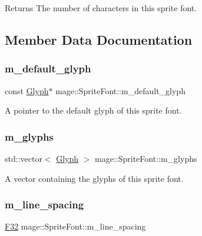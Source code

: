 \begin{DoxyReturn}{Returns}
The number of characters in this sprite font. 
\end{DoxyReturn}


\subsection{Member Data Documentation}
\hypertarget{classmage_1_1_sprite_font_ad25667d3bfb539b71b39124fdc8ed6d6}{}\label{classmage_1_1_sprite_font_ad25667d3bfb539b71b39124fdc8ed6d6} 
\subsubsection{\texorpdfstring{m\+\_\+default\+\_\+glyph}{m\_default\_glyph}}
{\footnotesize\ttfamily const \hyperlink{structmage_1_1_glyph}{Glyph}$\ast$ mage\+::\+Sprite\+Font\+::m\+\_\+default\+\_\+glyph\hspace{0.3cm}{\ttfamily [private]}}

A pointer to the default glyph of this sprite font. \hypertarget{classmage_1_1_sprite_font_a8862df8d743ea33996c76e421724c0a7}{}\label{classmage_1_1_sprite_font_a8862df8d743ea33996c76e421724c0a7} 
\subsubsection{\texorpdfstring{m\+\_\+glyphs}{m\_glyphs}}
{\footnotesize\ttfamily std\+::vector$<$ \hyperlink{structmage_1_1_glyph}{Glyph} $>$ mage\+::\+Sprite\+Font\+::m\+\_\+glyphs\hspace{0.3cm}{\ttfamily [private]}}

A vector containing the glyphs of this sprite font. \hypertarget{classmage_1_1_sprite_font_a0d85446d7a3e2c1f73a013314fca4d84}{}\label{classmage_1_1_sprite_font_a0d85446d7a3e2c1f73a013314fca4d84} 
\subsubsection{\texorpdfstring{m\+\_\+line\+\_\+spacing}{m\_line\_spacing}}
{\footnotesize\ttfamily \hyperlink{namespacemage_aa97e833b45f06d60a0a9c4fc22ae02c0}{F32} mage\+::\+Sprite\+Font\+::m\+\_\+line\+\_\+spacing\hspace{0.3cm}{\ttfamily [private]}}

